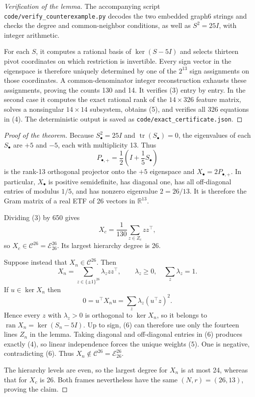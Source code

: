 \documentclass[11pt]{article}
\newcommand{\E}{\mathscr E}
\newcommand{\C}{\mathscr C}
\newcommand{\R}{\mathbb R}
\begin{document}
\begin{proof}[Verification of the lemma]
The accompanying script \texttt{code/verify\_counterexample.py} decodes the
two embedded graph6 strings and checks the degree and common-neighbor
conditions, as well as $S^2=25I$, with integer arithmetic.

For each $S$, it computes a rational basis of $\ker(S-5I)$ and selects thirteen
pivot coordinates on which restriction is invertible.  Every sign vector in
the eigenspace is therefore uniquely determined by one of the $2^{13}$ sign
assignments on those coordinates.  A common-denominator integer
reconstruction exhausts these assignments, proving the counts 130 and 14.
It verifies (3) entry by entry.  In the second case it computes the exact
rational rank of the $14\times326$ feature matrix, solves a nonsingular
$14\times14$ subsystem, obtains (5), and verifies all 326 equations in (4).
The deterministic output is saved as
\texttt{code/exact\_certificate.json}.
\end{proof}

\begin{proof}[Proof of the theorem]
Because $S_\bullet^2=25I$ and $\operatorname{tr}(S_\bullet)=0$, the eigenvalues
of each $S_\bullet$ are $+5$ and $-5$, each with multiplicity 13.  Thus
\[
 P_{\bullet,+}=\frac12\left(I+\frac15S_\bullet\right)
\]
is the rank-13 orthogonal projector onto the $+5$ eigenspace and
$X_\bullet=2P_{\bullet,+}$.  In particular, $X_\bullet$ is positive
semidefinite, has diagonal one, has all off-diagonal entries of modulus $1/5$,
and has nonzero eigenvalue $2=26/13$.  It is therefore the Gram matrix of a
real ETF of 26 vectors in $\R^{13}$.

Dividing (3) by 650 gives
\[
 X_c=\frac1{130}\sum_{z\in Z_c}zz^\top,
\]
so $X_c\in\C^{26}=\E_{26}^{26}$.  Its largest hierarchy degree is 26.

Suppose instead that $X_n\in\C^{26}$.  Then
\[
 X_n=\sum_{z\in\{\pm1\}^{26}}\lambda_z zz^\top,
 \qquad \lambda_z\ge0,\quad\sum_z\lambda_z=1.                  \tag{6}
\]
If $u\in\ker X_n$ then
\[
 0=u^\top X_nu=\sum_z\lambda_z(u^\top z)^2.
\]
Hence every $z$ with $\lambda_z>0$ is orthogonal to $\ker X_n$, so it belongs
to $\operatorname{ran}X_n=\ker(S_n-5I)$.  Up to sign, (6) can therefore use
only the fourteen lines $Z_n$ in the lemma.  Taking diagonal and
off-diagonal entries in (6) produces exactly (4), so linear independence
forces the unique weights (5).  One is negative, contradicting (6).  Thus
$X_n\notin\C^{26}=\E_{26}^{26}$.

The hierarchy levels are even, so the largest degree for $X_n$ is at most 24,
whereas that for $X_c$ is 26.  Both frames nevertheless have the same
$(N,r)=(26,13)$, proving the claim.
\end{proof}
\end{document}
